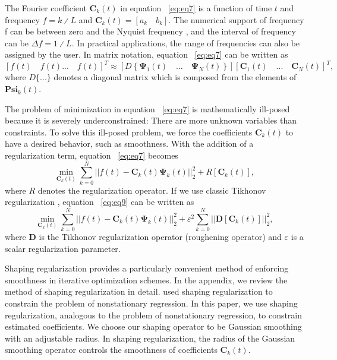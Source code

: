 The Fourier coefficient $\mathbf{C}_{k}(t)$ in equation ~\ref{eq:eq7} is a function of time $t$
and frequency $f = k∕L$ and $\mathbf{C}_{k}(t)=\left[a_{k} \quad b_{k}\right]$. The numerical
support of frequency f can be between zero and the Nyquist frequency
\cite[]{Cohen1995}, and the interval of frequency can be
$\Delta f = 1∕L $. In practical applications, the range of frequencies can
also be assigned by the user. In matrix notation, equation ~\ref{eq:eq7} can
be written as
      \begin{equation}
          \left[f(t) \quad f(t) ... \quad f(t)\right]^{T} \approx \left[D\left\{\mathbf{\Psi}_{1}(t) \quad ... \quad \mathbf{\Psi}_{N}(t)\right\}\right]\left[\mathbf{C}_{1}(t)\quad...\quad\mathbf{C}_{N}(t)\right]^{T},
        \label{eq:eq8}
      \end{equation}
where $D\{...\}$ denotes a diagonal matrix which is composed from
the elements of $\mathbf{Psi}_{k}(t)$.

The problem of minimization in equation ~\ref{eq:eq7} is mathematically
ill-posed because it is severely underconstrained: There are more
unknown variables than constraints. To solve this ill-posed problem,
we force the coefficients $\mathbf{C}_{k}(t)$ to have a desired behavior, such as
smoothness. With the addition of a regularization term, equation ~\ref{eq:eq7}
becomes
      \begin{equation}
          \min_{\mathbf{C}_{k}(t)}\sum_{k=0}^{N}\left|\left|f(t)-\mathbf{C}_{k}(t)\mathbf{\Psi}_{k}(t)\right|\right|_{2}^{2}+R\left[\mathbf{C}_{k}(t)\right],
        \label{eq:eq9}
      \end{equation}
where $R$ denotes the regularization operator. If we use classic
Tikhonov regularization \cite[]{Tikhonov1963}, equation ~\ref{eq:eq9} can be
written as
      \begin{equation}
          \min_{\mathbf{C}_{k}(t)}\sum_{k=0}^{N}\left|\left|f(t)-\mathbf{C}_{k}(t)\mathbf{\Psi}_{k}(t)\right|\right|_{2}^{2}+\varepsilon^{2} \sum_{k=0}^{N} \left|\left|\mathbf{D} \left[\mathbf{C}_{k}(t)\right]\right|\right|_{2}^{2},
        \label{eq:eq10}
      \end{equation}
where $\mathbf{D}$ is the Tikhonov regularization operator (roughening operator)
and $\varepsilon $ is a scalar regularization parameter.

Shaping regularization \cite[]{Fomel2007b} provides a particularly
convenient method of enforcing smoothness in iterative optimization
schemes. In the appendix, we review the method of shaping
regularization in detail. \cite{Fomel2009} used shaping regularization
to constrain the problem of nonstationary regression. In this paper,
we use shaping regularization, analogous to the problem of nonstationary
regression, to constrain estimated coefficients. We choose
our shaping operator to be Gaussian smoothing with an adjustable
radius. In shaping regularization, the radius of the Gaussian smoothing
operator controls the smoothness of coefficients $\mathbf{C}_{k}(t)$.

